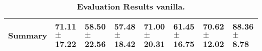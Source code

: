 \begin{table}[htb]
{\begin{tabular}{llllllll}
\midrule
\textbf{Summary                                  } &                  \phantom{0}71.11 $\pm$ 17.22 &                  \phantom{0}58.50 $\pm$ 22.56 &            \phantom{0}57.48 $\pm$ 18.42 &            \phantom{0}71.00 $\pm$ 20.31 &            \phantom{0}61.45 $\pm$ 16.75 &                  \phantom{0}70.62 $\pm$ 12.02 &  \phantom{0}88.36 $\pm$ \phantom{0}8.78 \\
\bottomrule
\end{tabular}%
}
\caption{\textbf{Evaluation Results vanilla.}}
\label{tab:eval-results}
\end{table}
